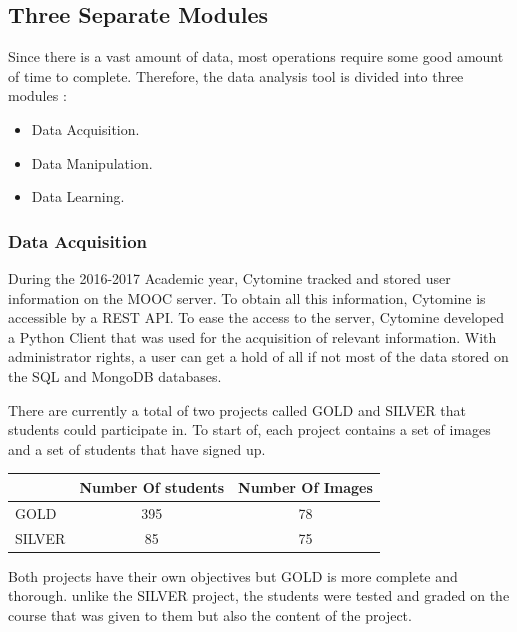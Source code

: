 \documentclass[a4paper,11pt]{report}
\numberwithin{figure}{section} %
\begin{document}
    \subsection{Three Separate Modules}
    	Since there is a vast amount of data, most operations require some good amount of time to complete.
    	Therefore, the data analysis tool is divided into three modules :
        \begin{itemize}
        \item[\textbullet] Data Acquisition.
        \item[\textbullet] Data Manipulation.
        \item[\textbullet] Data Learning.
        \end{itemize}

		\subsubsection{Data Acquisition}
        
			During the 2016-2017 Academic year, Cytomine tracked and stored user information on the MOOC server. To obtain all this information, Cytomine is accessible by a REST API. To ease the access to the server, Cytomine developed a Python Client that was used for the acquisition of relevant information. With administrator rights, a user can get a hold of all if not most of the data stored on the SQL and MongoDB databases.
            
          There are currently a total of two projects called GOLD and SILVER that students could participate in. To start of, each project contains a set of images and a set of students that have signed up.
          
          \begin{center}
          \begin{tabular}{| l | c | c |}
          \hline
           & Number Of students & Number Of Images \\ \hline
           GOLD & 395 & 78 \\ \hline
           SILVER & 85 & 75 \\
          \hline
          \end{tabular}
          \end{center}

		  Both projects have their own objectives but GOLD is more complete and thorough. unlike the SILVER project, the students were tested and graded on the course that was given to them but also the content of the project.
         
\end{document}

